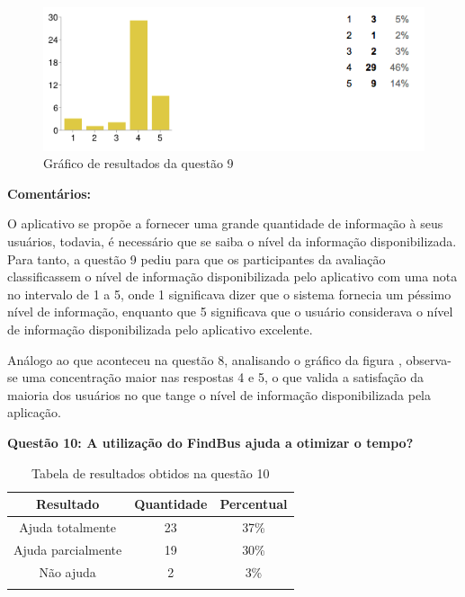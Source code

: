 \begin{figure}[h]
\begin{center}
  \includegraphics[width=16cm]{images/graficos/questao9.png}
  \caption{Gráfico de resultados da questão 9}
  \label{fig:questao9}
\end{center}
\end{figure}

\textbf{Comentários:}

O aplicativo se propõe a fornecer uma grande quantidade de informação à seus usuários, todavia, é necessário que se saiba o nível da informação disponibilizada. Para tanto, a questão 9 pediu para que os participantes da avaliação classificassem o nível de informação disponibilizada pelo aplicativo com uma nota no intervalo de 1 a 5, onde 1 significava dizer que o sistema fornecia um péssimo nível de informação, enquanto que 5 significava que o usuário considerava o nível de informação disponibilizada pelo aplicativo excelente. 
	
Análogo ao que aconteceu na questão 8, analisando o gráfico da figura , observa-se uma concentração maior nas respostas 4 e 5, o que valida a satisfação da maioria dos usuários no que tange o nível de informação disponibilizada pela aplicação. \newline

\textbf{Questão 10: A utilização do FindBus ajuda a otimizar o tempo?}

\begin{center}
\begin{longtable}{c|c|c}
\hline
    \multicolumn{1}{c}{\textbf{Resultado}} & \multicolumn{1}{c}{\textbf{Quantidade}} & \multicolumn{1}{c}{\textbf{Percentual}} \\
\hline
    Ajuda totalmente & 23 &  37\%\\
    \hline
    Ajuda parcialmente & 19 & 30\%\\
    \hline
    Não ajuda & 2 &  3\%\\
    \hline

\caption{Tabela de resultados obtidos na questão 10}
\label{tabq10}
\end{longtable}
\end{center}


